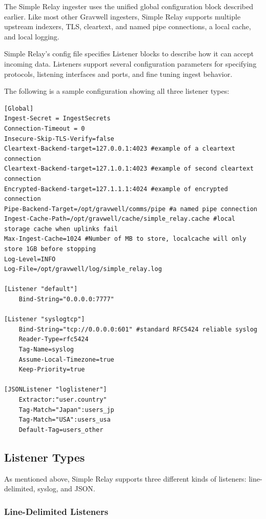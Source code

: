 The Simple Relay ingester uses the unified global configuration block
described earlier. Like most other Gravwell ingesters, Simple Relay
supports multiple upstream indexers, TLS, cleartext, and named pipe
connections, a local cache, and local logging.

Simple Relay's config file specifies Listener blocks to describe how it
can accept incoming data. Listeners support several configuration
parameters for specifying protocols, listening interfaces and ports, and
fine tuning ingest behavior.

The following is a sample configuration showing all three listener types:

\begin{Verbatim}[breaklines=true]
[Global]
Ingest-Secret = IngestSecrets
Connection-Timeout = 0
Insecure-Skip-TLS-Verify=false
Cleartext-Backend-target=127.0.0.1:4023 #example of a cleartext connection
Cleartext-Backend-target=127.1.0.1:4023 #example of second cleartext connection
Encrypted-Backend-target=127.1.1.1:4024 #example of encrypted connection
Pipe-Backend-Target=/opt/gravwell/comms/pipe #a named pipe connection
Ingest-Cache-Path=/opt/gravwell/cache/simple_relay.cache #local storage cache when uplinks fail
Max-Ingest-Cache=1024 #Number of MB to store, localcache will only store 1GB before stopping
Log-Level=INFO
Log-File=/opt/gravwell/log/simple_relay.log

[Listener "default"]
    Bind-String="0.0.0.0:7777" 

[Listener "syslogtcp"]
    Bind-String="tcp://0.0.0.0:601" #standard RFC5424 reliable syslog
    Reader-Type=rfc5424
    Tag-Name=syslog
    Assume-Local-Timezone=true
    Keep-Priority=true

[JSONListener "loglistener"]
    Extractor:"user.country"
    Tag-Match="Japan":users_jp
    Tag-Match="USA":users_usa
    Default-Tag=users_other
\end{Verbatim}

\subsection{Listener Types}

As mentioned above, Simple Relay supports three different kinds of
listeners: line-delimited, syslog, and JSON. 

\subsubsection*{Line-Delimited Listeners}

